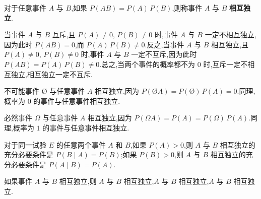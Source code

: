 \begin{definition}
    \indent 对于任意事件 $A$ 与 $B$,如果 $P(AB) = P(A) \, P(B)$,则称事件 $A$ 与 $B$ \textbf{相互独立}.
\end{definition}

\begin{note}
    \indent 当事件 $A$ 与 $B$ 互斥,且 $P(A) \not= 0, \, P(B) \not= 0$ 时,事件 $A$ 与 $B$ 一定不相互独立,因为此时 $P(AB) = 0$,而 $P(A) \, P(B) \not= 0$.反之,当事件 $A$ 与 $B$ 相互独立,且 $P(A) \not= 0, \, P(B) \not= 0$ 时,事件 $A$ 与 $B$ 一定不互斥,因为此时 $P(AB) = P(A) \, P(B) \not= 0$.总之,当两个事件的概率都不为 $0$ 时,互斥一定不相互独立,相互独立一定不互斥.

    不可能事件 $\text{\O}$ 与任意事件 $A$ 相互独立,因为 $P(\text{\O} A) = P(\text{\O}) \, P(A) = 0$.同理,概率为 $0$ 的事件与任意事件相互独立.

    必然事件 $\varOmega$ 与任意事件 $A$ 相互独立,因为 $P(\varOmega A) = P(A) = P(\varOmega) \, P(A)$.同理,概率为 $1$ 的事件与任意事件相互独立.
\end{note}

\begin{conclusion}
    \indent 对于同一试验 $E$ 的任意两个事件 $A$ 和 $B$,如果 $P(A) > 0$,则 $A$ 与 $B$ 相互独立的充分必要条件是 $P(B \mid A) = P(B)$;如果 $P(B) > 0$,则 $A$ 与 $B$ 相互独立的充分必要条件是 $P(A \mid B) = P(A)$.
\end{conclusion}

\begin{conclusion}
    \indent 如果事件 $A$ 与 $B$ 相互独立,则 $A$ 与 $\overline{B}$ 相互独立,$\overline{A}$ 与 $B$ 相互独立,$\overline{A}$ 与 $\overline{B}$ 相互独立.
\end{conclusion}

